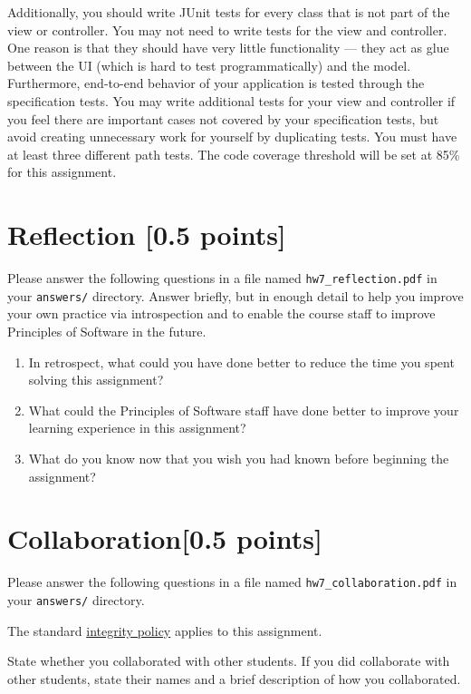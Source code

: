\documentclass[11pt]{article}
\begin{document}
\noindent Additionally, you should write JUnit tests for every class that is not part of the view or controller. You may not need to write tests for the view and controller. One reason is that they should  have very little functionality — they act as glue between the UI (which is hard to test programmatically) and the model. Furthermore, end-to-end behavior of your application is tested through the specification tests. You may write additional tests for your view and controller if you feel there are important cases not covered by your specification tests, but avoid creating unnecessary work for yourself by duplicating tests. You must have at least three different path tests. The code coverage threshold will be set at 85\% for this assignment.

\section*{Reflection [0.5 points]}
Please answer the following questions in a file named \texttt{hw7\_reflection.pdf} in your \texttt{answers/} directory. Answer briefly, but in enough detail to help you improve your own practice via introspection and to enable the course staff to improve Principles of Software in the future.
\begin{enumerate}
\item In retrospect, what could you have done better to reduce the time you spent solving this assignment?
\item What could the Principles of Software staff have done better to improve your learning experience in this assignment?
\item What do you know now that you wish you had known before beginning the assignment?
\end{enumerate}

\section*{Collaboration[0.5 points]}
Please answer the following questions in a file named \texttt{hw7\_collaboration.pdf} in your \texttt{answers/} directory.

\noindent The standard \href{https://www.cs.rpi.edu/academics/courses/spring23/csci2600/Documents/syllabus_CSCI_2600_Spring_2023.pdf}{integrity policy} applies to this assignment.

\noindent State whether you collaborated with other students. If you did collaborate with other students, state their names and a brief description of how you collaborated.
\end{document}
